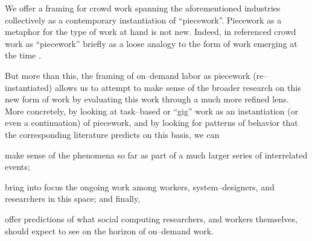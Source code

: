 \documentclass[trackingWork]{subfiles}
\begin{document}

We offer a framing for crowd work spanning the aforementioned industries
collectively as a contemporary instantiation of ``piecework''.
Piecework as a metaphor for the type of work at hand is not new.
Indeed,
\citeauthor{crowdworkFuture}
in
\citeyear{crowdworkFuture}
referenced crowd work as ``piecework'' briefly
as a loose analogy to the form of work emerging at the time
\cite{crowdworkFuture}.


But more than this,
the framing of on--demand labor as piecework (re--instantiated)
allows us to attempt to make sense of the broader research on this new form of work
by evaluating this work through a much more refined lens.
More concretely, by looking at task--based or ``gig'' work as
an instantiation (or even a continuation) of piecework,
and by looking for patterns of behavior that the corresponding literature predicts
on this basis, we can
\begin{inlinelist}
  \item make sense of the phenomena so far as part of a much larger series of interrelated events;
  \item bring into focus the ongoing work among workers, system--designers, and researchers in this space; and finally,
  \item offer predictions of what social computing researchers,
        and workers themselves,
        should expect to see on the horizon of on--demand work.
\end{inlinelist}
\end{document}
